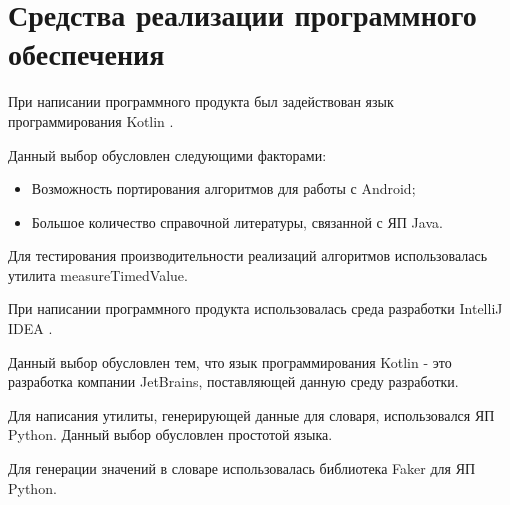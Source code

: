 \documentclass[12pt]{report}
\begin{document}
\section{Средства реализации программного обеспечения}
При написании программного продукта был задействован язык программирования Kotlin \cite{Kotlin}.

Данный выбор обусловлен следующими факторами:
\begin{itemize}
\item Возможность портирования алгоритмов для работы с Android;
\item Большое количество справочной литературы, связанной с ЯП Java.
\end{itemize}

Для тестирования производительности реализаций алгоритмов использовалась утилита measureTimedValue.

При написании программного продукта использовалась среда разработки IntelliJ IDEA \cite{IntelliJ}.

Данный выбор обусловлен тем, что язык программирования Kotlin - это разработка компании JetBrains, поставляющей данную среду разработки.

Для написания утилиты, генерирующей данные для словаря, использовался ЯП Python\cite{Python}. 
Данный выбор обусловлен простотой языка.

Для генерации значений в словаре использовалась библиотека Faker \cite{Faker} для ЯП Python.
\end{document}
